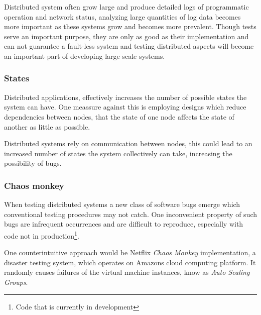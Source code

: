 \documentclass[10pt]{sensys-abstract}
\begin{document}
Distributed system often grow large and produce detailed logs of programmatic operation and network status, analyzing large quantities of log data becomes more important as these systems grow and becomes more prevalent. Though tests serve an important purpose, they are only as good as their implementation and can not guarantee a fault-less system and testing distributed aspects will become an important part of developing large scale systems.

\subsubsection{States}\noindent
Distributed applications, effectively increases the number of possible states the system can have. One meassure against this is employing designs which reduce dependencies between nodes, that the state of one node affects the state of another as little as possible.

Distributed systems rely on communication between nodes, this could lead to an increased number of states the system collectively can take, increasing the possibility of bugs.\cite{Rikitake:2011:2034654} %


\subsubsection{Chaos monkey}\noindent
\label{sec:monkey}
When testing distributed systems a new class of software bugs emerge which conventional testing procedures may not catch. One inconvenient property of such bugs are infrequent occurrences and are difficult to reproduce, especially with code not in production\footnote{Code that is currently in development}.

One counterintuitive approach would be Netflix \emph{Chaos Monkey} implementation, a disaster testing system, which operates on Amazons cloud computing platform. It randomly causes failures of the virtual machine instances, know as \emph{Auto Scaling Groups}.\cite{netflix_chaosmonkey}
\end{document}
